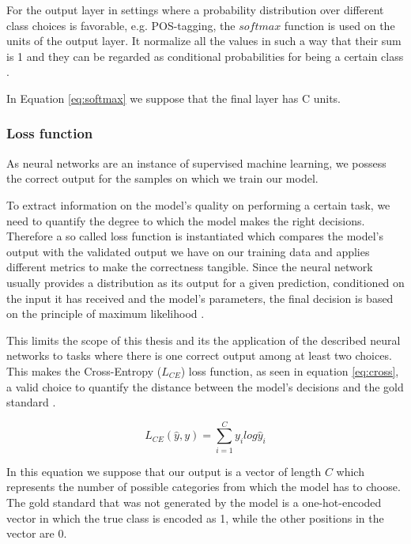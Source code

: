 For the output layer in settings where a probability distribution over different class choices is favorable, e.g. POS-tagging, the $softmax$ function is used on the units of the output layer. 
It normalize all the values in such a way that their sum is 1 and they can be regarded as conditional probabilities for being a certain class \citep{jurafsky2021}.

In Equation \ref{eq:softmax} we suppose that the final layer has C units.




\subsubsection{Loss function}
As neural networks are an instance of supervised machine learning, we possess the correct output for the samples on which we train our model. 

To extract information on the model's quality on performing a certain task, we need to quantify the degree to which the model makes the right decisions. 
Therefore a so called loss function is instantiated which compares the model's output with the validated output we have on our training data and applies different metrics to make the correctness tangible.
Since the neural network usually provides a distribution as its output for a given prediction, conditioned on the input it has received and the model's parameters, the final decision is based on the principle of maximum likelihood \citep{jurafsky2021}.

This limits the scope of this thesis and its the application of the described neural networks to tasks where there is one correct output among at least two choices.
This makes the Cross-Entropy ($L_{CE}$) loss function, as seen in equation \ref{eq:cross}, a valid choice to quantify the distance between the model's decisions and the gold standard \citep{Goodfellow-et-al-2016}.

\begin{equation}
\label{eq:cross}
    L_{CE}(\hat{y},y) = \sum_{i=1}^{C} y_i log\hat{y}_i
\end{equation}

In this equation we suppose that our output is a vector of length $C$ which represents the number of possible categories from which the model has to choose. 
The gold standard that was not generated by the model is a one-hot-encoded vector in which the true class is encoded as 1, while the other positions in the vector are 0.


